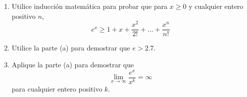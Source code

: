 \item 
\begin{enumerate}
    \item[(a)] Utilice inducción matemática para probar que para $x \ge 0$ y cualquier entero positivo $n$,
    $$e^x \ge 1 + x + \frac{x^2}{2!} + \dots + \frac{x^n}{n!}$$
    \item[(b)] Utilice la parte (a) para demostrar que $e > 2.7$.
    \item[(c)] Aplique la parte (a) para demostrar que
    $$\lim_{x \to \infty} \frac{e^x}{x^k} = \infty$$
    para cualquier entero positivo $k$.
\end{enumerate}
